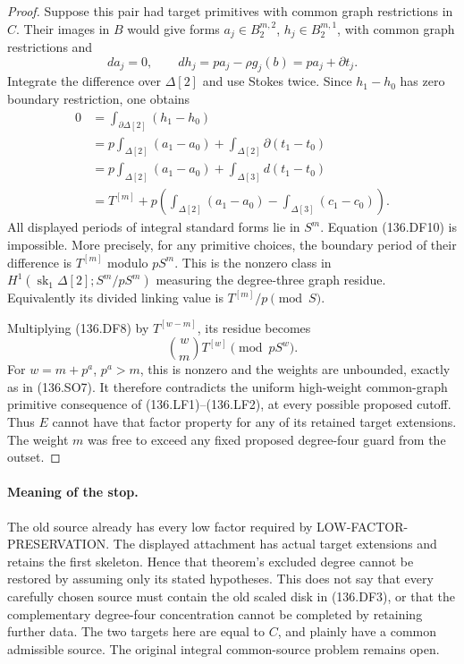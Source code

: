 \begin{proof}
Suppose this pair had target primitives with common graph
restrictions in \(C\).  Their images in \(B\) would
give forms \(a_j\in B_2^{m,2}\),
\(h_j\in B_2^{m,1}\), with common graph restrictions and
\[
              da_j=0,\qquad
              dh_j=pa_j-\rho g_j(b)=pa_j+\partial t_j.
                                                               \tag{136.DF9}
\]
Integrate the difference over \(\Delta[2]\) and use
Stokes twice.  Since \(h_1-h_0\) has zero boundary
restriction, one obtains
\[
 \begin{aligned}
 0&=\int_{\partial\Delta[2]}(h_1-h_0)\\
  &=p\int_{\Delta[2]}(a_1-a_0)
                         +\int_{\Delta[2]}\partial(t_1-t_0)\\
  &=p\int_{\Delta[2]}(a_1-a_0)
                         +\int_{\Delta[3]}d(t_1-t_0)\\
  &=T^{[m]}+
       p\left(\int_{\Delta[2]}(a_1-a_0)
                        -\int_{\Delta[3]}(c_1-c_0)\right).
 \end{aligned}                                                \tag{136.DF10}
\]
All displayed periods of integral standard forms lie in \(S^m\).
Equation (136.DF10) is impossible.  More precisely, for any
primitive choices, the boundary period of their difference is
\(T^{[m]}\) modulo \(pS^m\).  This is the nonzero
class in \(H^1(\operatorname{sk}_1\Delta[2];S^m/pS^m)\)
measuring the degree-three graph residue.  Equivalently its
divided linking value is \(T^{[m]}/p\pmod S\).

Multiplying (136.DF8) by \(T^{[w-m]}\), its residue
becomes
\[
                         \binom wm T^{[w]}
                                      \pmod{pS^w}.
                                                               \tag{136.DF11}
\]
For \(w=m+p^a\), \(p^a>m\), this is nonzero and
the weights are unbounded, exactly as in (136.SO7).
It therefore contradicts the uniform high-weight common-graph
primitive consequence of (136.LF1)--(136.LF2), at every
possible proposed cutoff.  Thus \(E\) cannot have that
factor property for any of its retained target extensions.
The weight \(m\) was free to exceed any fixed proposed
degree-four guard from the outset.
\end{proof}

\paragraph{Meaning of the stop.}
The old source already has every low factor required by
LOW-FACTOR-PRESERVATION.  The displayed attachment has actual
target extensions and retains the first skeleton.  Hence that
theorem's excluded degree cannot be restored by assuming only
its stated hypotheses.  This does not say that every carefully
chosen source must contain the old scaled disk in (136.DF3),
or that the complementary degree-four concentration cannot be
completed by retaining further data.  The two targets here
are equal to \(C\), and plainly have a common admissible
source.  The original integral common-source problem remains open.

